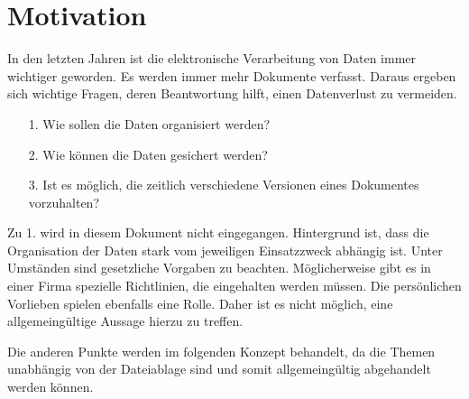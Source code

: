 

\section{Motivation}

In den letzten Jahren ist die elektronische Verarbeitung von Daten immer
wichtiger geworden. Es werden immer mehr Dokumente verfasst. Daraus ergeben
sich wichtige Fragen, deren Beantwortung hilft, einen Datenverlust zu vermeiden.

\begin{itemize}
    \item[1.] Wie sollen die Daten organisiert werden?
    \item[2.] Wie können die Daten gesichert werden?
    \item[3.] Ist es möglich, die zeitlich verschiedene Versionen eines Dokumentes
          vorzuhalten?
\end{itemize}

Zu 1. wird in diesem Dokument nicht eingegangen. Hintergrund ist, dass die
Organisation der Daten stark vom jeweiligen Einsatzzweck abhängig ist. Unter
Umständen sind gesetzliche Vorgaben zu beachten. Möglicherweise gibt es in
einer Firma spezielle Richtlinien, die eingehalten werden müssen. Die
persönlichen Vorlieben spielen ebenfalls eine Rolle. Daher ist es nicht
möglich, eine allgemeingültige Aussage hierzu zu treffen.
\bigskip

Die anderen Punkte werden im folgenden Konzept behandelt, da die Themen
unabhängig von der Dateiablage sind und somit allgemeingültig abgehandelt
werden können.

